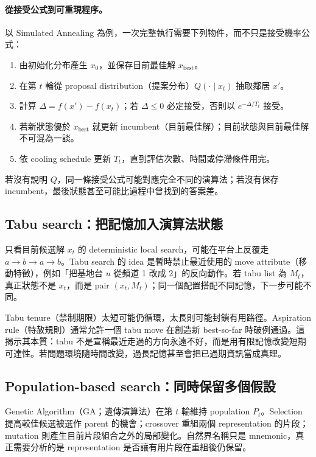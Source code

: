\documentclass[11pt,a4paper,oneside,openany]{book}
\begin{document}
\paragraph{從接受公式到可重現程序。}
以 Simulated Annealing 為例，一次完整執行需要下列物件，而不只是接受機率公式：
\begin{enumerate}[itemsep=0pt,topsep=.2ex]
\item 由初始化分布產生 $x_0$，並保存目前最佳解 $x_{\mathrm{best}}$。
\item 在第 $t$ 輪從 proposal distribution（提案分布）$Q(\cdot\mid x_t)$ 抽取鄰居 $x'$。
\item 計算 $\Delta=f(x')-f(x_t)$；若 $\Delta\le0$ 必定接受，否則以 $e^{-\Delta/T_t}$ 接受。
\item 若新狀態優於 $x_{\mathrm{best}}$ 就更新 incumbent（目前最佳解）；目前狀態與目前最佳解不可混為一談。
\item 依 cooling schedule 更新 $T_t$，直到評估次數、時間或停滯條件用完。
\end{enumerate}
若沒有說明 $Q$，同一條接受公式可能對應完全不同的演算法；若沒有保存 incumbent，最後狀態甚至可能比過程中曾找到的答案差。

\subsection{Tabu search：把記憶加入演算法狀態}
只看目前候選解 $x_t$ 的 deterministic local search，可能在平台上反覆走 $a\to b\to a\to b$。Tabu search 的 idea 是暫時禁止最近使用的 move attribute（移動特徵），例如「把基地台 $u$ 從頻道 1 改成 2」的反向動作。若 tabu list 為 $M_t$，真正狀態不是 $x_t$，而是 pair $(x_t,M_t)$；同一個配置搭配不同記憶，下一步可能不同。

Tabu tenure（禁制期限）太短可能仍循環，太長則可能封鎖有用路徑。Aspiration rule（特赦規則）通常允許一個 tabu move 在創造新 best-so-far 時破例通過。這揭示其本質：tabu 不是宣稱最近走過的方向永遠不好，而是用有限記憶改變短期可達性。若問題環境隨時間改變，過長記憶甚至會把已過期資訊當成真理。

\subsection{Population-based search：同時保留多個假設}
Genetic Algorithm（GA；遺傳演算法）在第 $t$ 輪維持 population $P_t$。Selection 提高較佳候選被選作 parent 的機會；crossover 重組兩個 representation 的片段；mutation 則產生目前片段組合之外的局部變化。自然界名稱只是 mnemonic，真正需要分析的是 representation 是否讓有用片段在重組後仍保留。
\end{document}
